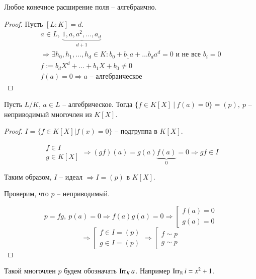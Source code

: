 \documentclass[main]{subfiles}
\begin{document}
\begin{proposition}
    Любое конечное расширение поля -- алгебраично.
\end{proposition}

\begin{proof}
    Пусть $[L:K] = d$.
    \begin{gather*}
        a \in L, \ \underbrace{1, a, a^2, \ldots, a_d}_{d+1} \\
        \Rightarrow \exists h_0, h_1, \ldots, h_d \in K : b_0 + b_1a + \ldots b_da^d = 0 \text{ и не все } b_i = 0\\
        f:= b_dX^d + \ldots + b_1 X + b_0 \ne 0 \\
        f(a) = 0 \Rightarrow a \text{ -- алгебраическое }
    \end{gather*}
\end{proof}

\begin{proposition}
    Пусть $L / K$, $a \in L$ -- алгебрическое. Тогда $ \{ f \in K[X] \ | \  f(a) = 0 \} = (p), \ 
    p$ -- неприводимый многочлен из $K[X]$.
\end{proposition}

\begin{proof}
    $ I = \{ f \in K[X] | f(x) = 0 \} \text{ -- подгруппа в } K[X]$.

    \[\left.
    \begin{gathered}
        f \in I \\
        g \in K[X]
    \end{gathered} \right. \Rightarrow (gf)(a) = g(a)\underbrace{f(a)}_{0} = 0 \Rightarrow gf \in I \]

    Таким образом, $I$ -- идеал $\Rightarrow I = (p)$ в $K[X]$. 

    Проверим, что $p$ -- неприводимый.
  
    \[p = fg, \ 
    p(a) = 0 \Rightarrow f(a)g(a) = 0 \Rightarrow \left[ \begin{gathered}
        f(a) = 0 \\
        g(a) = 0
    \end{gathered} \right. \]
    \[ \Rightarrow \left[ \begin{gathered}
        f \in I = (p) \\
        g \in I = (p)
    \end{gathered} \right. \Rightarrow \left[ \begin{gathered}
        f \sim p \\
        g \sim p
    \end{gathered} \right. \]
\end{proof}
Такой многочлен $p$ будем обозначать $\operatorname{Irr}_K a$. Например $\operatorname{Irr}_{\mathbb{R}} i = x^2 + 1$. \\
\end{document}
